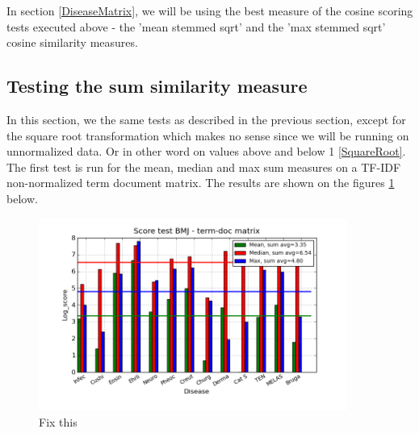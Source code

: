 In section \ref{DiseaseMatrix}, we will be using the best measure of the cosine scoring tests executed above - the 'mean stemmed sqrt' and the 'max stemmed sqrt' cosine similarity measures.

\subsection{Testing the sum similarity measure\label{TestingSumSimilarity}}

In this section, we the same tests as described in the previous section, except for the square root transformation which makes no sense since we will be running on unnormalized data. Or in other word on values above and below 1 \ref{SquareRoot}. The first test is run for the mean, median and max sum measures on a TF-IDF non-normalized term document matrix. The results are shown on the figures \ref{termDoc_bmj_hist_3000_sum_mea_med_max} below. 

\begin{figure}[H]
        \begin{center}
          \includegraphics[width=0.9\textwidth]{barcharts/termDoc_bmj_hist_3000_sum_mea_med_max.png}
        \end{center}
        \caption{Fix this}
        \label{termDoc_bmj_hist_3000_sum_mea_med_max}
\end{figure}

